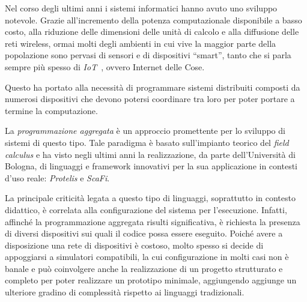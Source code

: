\label{ch:intro}

Nel corso degli ultimi anni i sistemi informatici hanno avuto uno sviluppo notevole.
Grazie all'incremento della potenza computazionale disponibile a basso costo, alla riduzione delle dimensioni delle unità di calcolo e alla diffusione delle reti wireless,
ormai molti degli ambienti in cui vive la maggior parte della popolazione sono pervasi di sensori e di dispositivi ``smart'', tanto che si parla sempre più spesso di \emph{IoT}~\cite{ashton2009internet}, ovvero Internet delle Cose.

Questo ha portato alla necessità di programmare sistemi distribuiti composti da numerosi dispositivi che devono potersi coordinare tra loro
per poter portare a termine la computazione.

La \emph{programmazione aggregata} è un approccio promettente per lo sviluppo di sistemi di questo tipo.
Tale paradigma è basato sull'impianto teorico del \emph{field calculus} e ha visto negli ultimi anni la realizzazione,
da parte dell'Università di Bologna, di linguaggi e framework innovativi per la sua applicazione in contesti d'uso reale:
\emph{Protelis} e \emph{ScaFi}.


La principale criticità legata a questo tipo di linguaggi, soprattutto in contesto didattico, è correlata alla configurazione del sistema per l'esecuzione.
Infatti, affinché la programmazione aggregata risulti significativa, è richiesta la presenza di diversi dispositivi sui quali il codice possa essere eseguito.
Poiché avere a disposizione una rete di dispositivi è costoso, molto spesso si decide di appoggiarsi a simulatori compatibili,
la cui configurazione in molti casi non è banale e può coinvolgere anche la realizzazione di un progetto strutturato e completo per poter realizzare un prototipo minimale,
aggiungendo aggiunge un ulteriore gradino di complessità rispetto ai linguaggi tradizionali.

